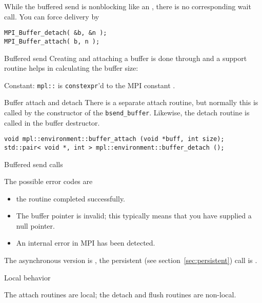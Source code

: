 While the buffered send is nonblocking like an ,
there is no corresponding wait call.
You can force delivery by
\begin{lstlisting}
MPI_Buffer_detach( &b, &n );
MPI_Buffer_attach( b, n );
\end{lstlisting}

\begin{mplnote}{Buffered send}
  Creating and attaching a buffer is done through 
  and a support routine  helps in calculating
  the buffer size:

  Constant: \lstinline+mpl::+ is \lstinline{constexpr}'d
  to the MPI constant .
\end{mplnote}

\begin{mplnote}{Buffer attach and detach}
  There is a separate attach routine, but normally this is called
  by the constructor of the \lstinline+bsend_buffer+.
  Likewise, the detach routine is called in the buffer destructor.
\begin{lstlisting}
void mpl::environment::buffer_attach (void *buff, int size);
std::pair< void *, int > mpl::environment::buffer_detach ();
\end{lstlisting}
\end{mplnote}

 {Buffered send calls}

The possible error codes are
\begin{itemize}
\item {} the routine completed successfully.
\item {} The buffer pointer is invalid;
  this typically means that you have supplied a null pointer.
\item {} An internal error in MPI has been detected.
\end{itemize}

The asynchronous version is , the persistent
(see section~\ref{sec:persistent}) call is .

 {Local behavior}

The attach routines are local; the detach and flush routines are non-local.
